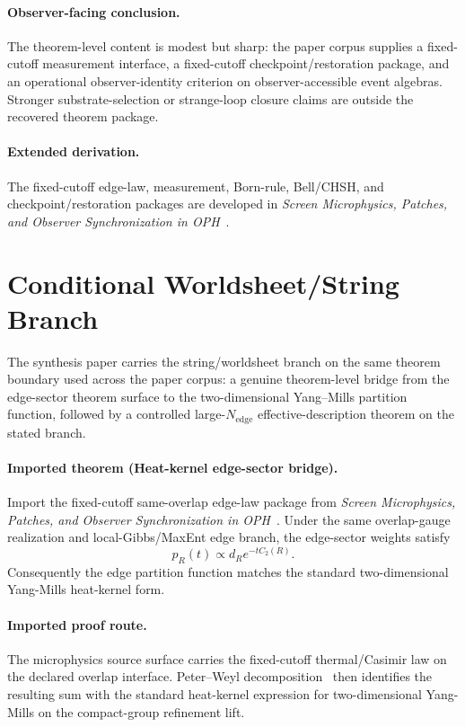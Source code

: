 \paragraph{Observer-facing conclusion.}
The theorem-level content is modest but sharp: the paper corpus supplies a fixed-cutoff measurement interface,
a fixed-cutoff checkpoint/restoration package, and an operational observer-identity criterion on
observer-accessible event algebras. Stronger substrate-selection or strange-loop closure claims
are outside the recovered theorem package.

\paragraph{Extended derivation.}
The fixed-cutoff edge-law, measurement, Born-rule, Bell/CHSH, and checkpoint/restoration packages are developed in
\emph{Screen Microphysics, Patches, and Observer Synchronization in OPH}~\cite{ophmicrophysics}.

\section{Conditional Worldsheet/String Branch}

The synthesis paper carries the string/worldsheet branch on the same theorem boundary used across
the paper corpus: a genuine theorem-level bridge from the edge-sector theorem surface to
the two-dimensional Yang--Mills partition function, followed by a controlled large-\(N_{\mathrm{edge}}\)
effective-description theorem on the stated branch.

\paragraph{Imported theorem (Heat-kernel edge-sector bridge).}
Import the fixed-cutoff same-overlap edge-law package from
\emph{Screen Microphysics, Patches, and Observer Synchronization in OPH}~\cite{ophmicrophysics}.
Under the same overlap-gauge realization and local-Gibbs/MaxEnt edge branch, the edge-sector
weights satisfy
\[
p_R(t)\propto d_R e^{-t C_2(R)}.
\]
Consequently the edge partition function matches the standard two-dimensional Yang-Mills
heat-kernel form.

\paragraph{Imported proof route.}
The microphysics source surface carries the fixed-cutoff thermal/Casimir law on the declared
overlap interface. Peter--Weyl decomposition~\cite{peterWeyl27}
then identifies the resulting sum with the standard heat-kernel expression for
two-dimensional Yang-Mills on the compact-group refinement lift.

